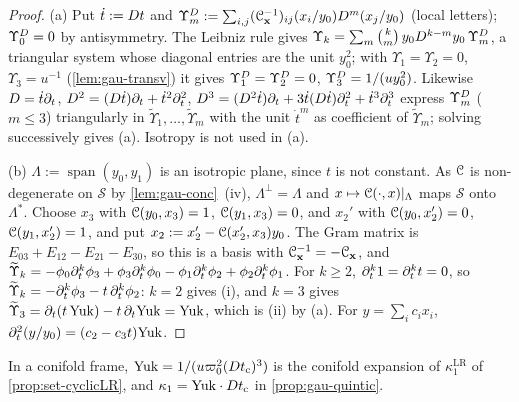 \begin{proof}
(a) Put $\dot t:=D t$ and $\Upsilon^{D}_m:=\sum_{i,j}(\mathcal{C}_{\mathbf x}^{-1})_{ij}(x_i/y_0)D^m(x_j/y_0)$ (local letters); $\Upsilon^{D}_0=0$ by antisymmetry. The Leibniz rule gives $\Upsilon_k=\sum_m\binom km\,y_0D^{k-m}y_0\,\Upsilon^{D}_m$, a triangular system whose diagonal entries are the unit $y_0^2$; with $\Upsilon_1=\Upsilon_2=0$, $\Upsilon_3=u^{-1}$ (\cref{lem:gau-transv}) it gives $\Upsilon^{D}_1=\Upsilon^{D}_2=0$, $\Upsilon^{D}_3=1/(uy_0^2)$. Likewise $D=\dot t\partial_t$, $D^2=(D\dot t)\partial_t+\dot t^2\partial_t^2$, $D^3=(D^2\dot t)\partial_t+3\dot t(D\dot t)\partial_t^2+\dot t^3\partial_t^3$ express $\Upsilon^{D}_m$ ($m\leq3$) triangularly in $\widetilde\Upsilon_1,\dots,\widetilde\Upsilon_m$ with the unit $\dot t^m$ as coefficient of $\widetilde\Upsilon_m$; solving successively gives (a). Isotropy is not used in (a).

(b) $\Lambda:=\operatorname{span}(y_0,y_1)$ is an isotropic plane, since $t$ is not constant. As $\mathcal{C}$ is non-degenerate on $\mathcal S$ by \cref{lem:gau-conc}~(iv), $\Lambda^\perp=\Lambda$ and $x\mapsto\mathcal{C}(\cdot,x)|_\Lambda$ maps $\mathcal S$ onto $\Lambda^*$. Choose $x_3$ with $\mathcal{C}(y_0,x_3)=1$, $\mathcal{C}(y_1,x_3)=0$, and $x_2'$ with $\mathcal{C}(y_0,x_2')=0$, $\mathcal{C}(y_1,x_2')=1$, and put $x_2:=x_2'-\mathcal{C}(x_2',x_3)y_0$. The Gram matrix is $E_{03}+E_{12}-E_{21}-E_{30}$, so this is a basis with $\mathcal{C}_{\mathbf x}^{-1}=-\mathcal{C}_{\mathbf x}$, and $\widetilde\Upsilon_k=-\phi_0\partial_t^k\phi_3+\phi_3\partial_t^k\phi_0-\phi_1\partial_t^k\phi_2+\phi_2\partial_t^k\phi_1$. For $k\geq2$, $\partial_t^k1=\partial_t^kt=0$, so $\widetilde\Upsilon_k=-\partial_t^k\phi_3-t\,\partial_t^k\phi_2$: $k=2$ gives (i), and $k=3$ gives $\widetilde\Upsilon_3=\partial_t(t\,\mathrm{Yuk})-t\,\partial_t\mathrm{Yuk}=\mathrm{Yuk}$, which is (ii) by (a). For $y=\sum_ic_ix_i$, $\partial_t^2(y/y_0)=(c_2-c_3t)\mathrm{Yuk}$.
\end{proof}

In a conifold frame, $\mathrm{Yuk}=1/(u\varpi_0^2(Dt_{\mathrm{c}})^3)$ is the conifold expansion of $\kappa^{\mathrm{LR}}_1$ of \cref{prop:set-cyclicLR}, and $\kappa_1=\mathrm{Yuk}\cdot Dt_{\mathrm{c}}$ in \cref{prop:gau-quintic}.

